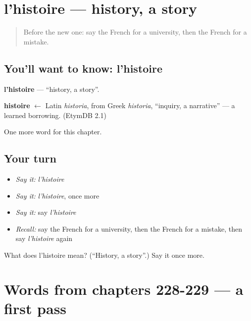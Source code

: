 \section[l'histoire]{l'histoire — history, a story}

\label{lesson:FR-C232-histoire}



\begin{quote}
Before the new one: say the French for a university, then the French for a mistake.
\end{quote}

\subsection*{You'll want to know: l'histoire}
\textbf{l'histoire} — \textquotedblleft{}history, a story\textquotedblright{}.

\begin{cousinweb}
\textbf{histoire} $\leftarrow$ Latin \emph{historia}, from Greek \emph{historia}, \textquotedblleft{}inquiry, a narrative\textquotedblright{} — a learned borrowing. (EtymDB 2.1)
\end{cousinweb}

\begin{grammarlens}[title={What you've built}]
One more word for this chapter.
\end{grammarlens}

\subsection*{Your turn}
\begin{itemize}
\raggedright
  \item \emph{Say it:} \emph{l'histoire}
  \item \emph{Say it:} \emph{l'histoire}, once more
  \item \emph{Say it:} say \emph{l'histoire}
  \item \emph{Recall:} say the French for a university, then the French for a mistake, then say \emph{l'histoire} again
\end{itemize}

\begin{tcolorbox}[breakable,colback=teal!4,colframe=teal!35!black,title={Before you move on}]
What does l'histoire mean? (\textquotedblleft{}History, a story\textquotedblright{}.) Say it once more.
\end{tcolorbox}
\section[(dialogue)]{Words from chapters 228-229 — a first pass}

